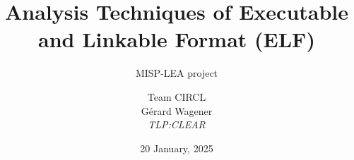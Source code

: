 \documentclass{beamer}
\author{\small{Team CIRCL\\G{\'e}rard Wagener \\ \emph{TLP:CLEAR}}}
\title{Analysis Techniques of Executable and Linkable Format (ELF)}
\subtitle{MISP-LEA project}
\institute{\href{https://www.circl.lu}{https://www.circl.lu} \\}
\date{20 January, 2025}
\begin{document}
\begin{frame}
    \maketitle
\end{frame}







\end{document}
